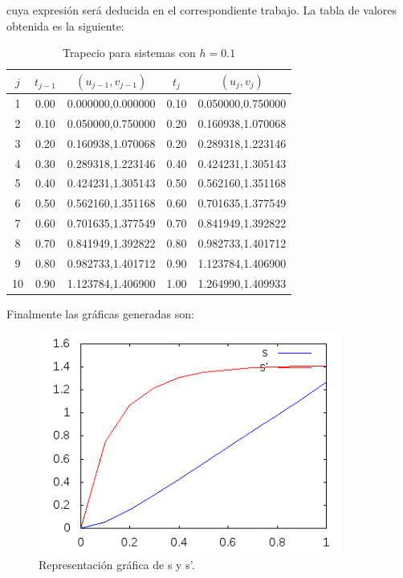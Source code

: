 \documentclass{article}
\theoremstyle{theorem-style}  %
\theoremstyle{definition-style}
\theoremstyle{example-style}
\begin{document}
cuya expresión será deducida en el correspondiente trabajo. La tabla de valores obtenida es la siguiente:

 \begin{table}[H]
		\centering
		\begin{tabular}{|| c | c | c | c | c ||}
			\hline
			\hline $j$ &  $t_{j-1}$ & $(u_{j-1},v_{j-1})$ & $t_j$ & $(u_{j},v_{j})$ \\
			\hline 1 & 0.00 & 0.000000,0.000000 & 0.10 & 0.050000,0.750000 \\
			\hline 2 & 0.10 & 0.050000,0.750000 & 0.20 & 0.160938,1.070068 \\
			\hline 3 & 0.20 & 0.160938,1.070068 & 0.20 & 0.289318,1.223146 \\
			\hline 4 & 0.30 & 0.289318,1.223146 & 0.40 & 0.424231,1.305143 \\
			\hline 5 & 0.40 & 0.424231,1.305143 & 0.50 & 0.562160,1.351168 \\
			\hline 6 & 0.50 & 0.562160,1.351168 & 0.60 & 0.701635,1.377549 \\
			\hline 7 & 0.60 & 0.701635,1.377549 & 0.70 & 0.841949,1.392822 \\
			\hline 8 & 0.70 & 0.841949,1.392822 & 0.80 & 0.982733,1.401712 \\
			\hline 9 & 0.80 & 0.982733,1.401712 & 0.90 & 1.123784,1.406900 \\
			\hline 10 & 0.90 & 1.123784,1.406900 & 1.00 & 1.264990,1.409933 \\
			\hline
			\hline
		\end{tabular}
		\caption{Trapecio para sistemas con $h=0.1$}
		\label{table:trapecio-ej3}
	\end{table}

	Finalmente las gráficas generadas son:

	\begin{figure}[h]
		\centering
		\includegraphics[width=10cm]{./Images/ejemplo3-1.png}
		\caption{Representación gráfica de s y s'.}
		\label{fig:ejemplo3-1}
	\end{figure}
\end{document}
